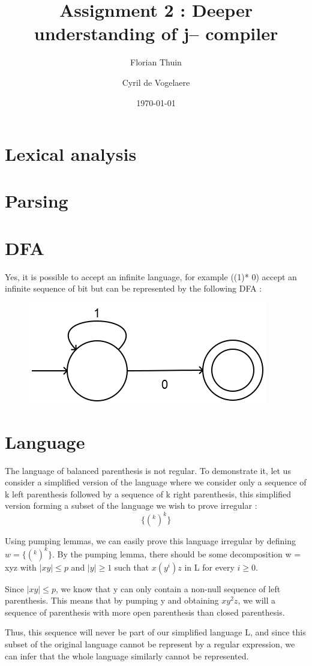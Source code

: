 \documentclass[a4paper, 11pt]{article}
\author{Florian Thuin \and Cyril de Vogelaere}
\date{\today}
\title{Assignment 2 : Deeper understanding of j-- compiler}
\begin{document}
    \maketitle
    \tableofcontents
    \section{Lexical analysis}
    \section{Parsing}
    \section{DFA}
    	Yes, it is possible to accept an infinite language, for example
    	((1)* 0) accept an infinite sequence of bit but can be 
    	represented by the following DFA :
    	
    	\begin{figure}[!h]
    		\center
    		\includegraphics[scale=0.5]{DFAQ3.png}
    	\end{figure}
    	
    \section{Language}
    	The language of balanced parenthesis is not regular. 
    	To demonstrate it, let us consider a simplified version of the language 
    	where we consider only a sequence of k left parenthesis followed by
    	a sequence of k right parenthesis, this simplified version forming
    	a subset of the language we wish to prove irregular :
    	\newline
    	$$\{(^k )^k\}$$
    	
    	Using pumping lemmas, we can easily prove this language irregular by defining 
    	$w = \{(^k )^k\}$. By the pumping lemma, there should be some decomposition 
    	w = xyz with $|xy| \le p$ and $|y| \ge 1$ such that $x(y^i)z$ 
    	in L for every $i \ge 0$. \newline
    	
    	Since $|xy| \le p$, we know that y can only contain a non-null sequence of 
    	left parenthesis. This means that by pumping y and obtaining $xy^2 z$, we will
    	a sequence of parenthesis with more open parenthesis than closed parenthesis.
    	\newline
    	
    	Thus, this sequence will never be part of our simplified language L, and since
    	this subset of the original language cannot be represent by a regular expression,
    	we can infer that the whole language similarly cannot be represented.
\end{document}
